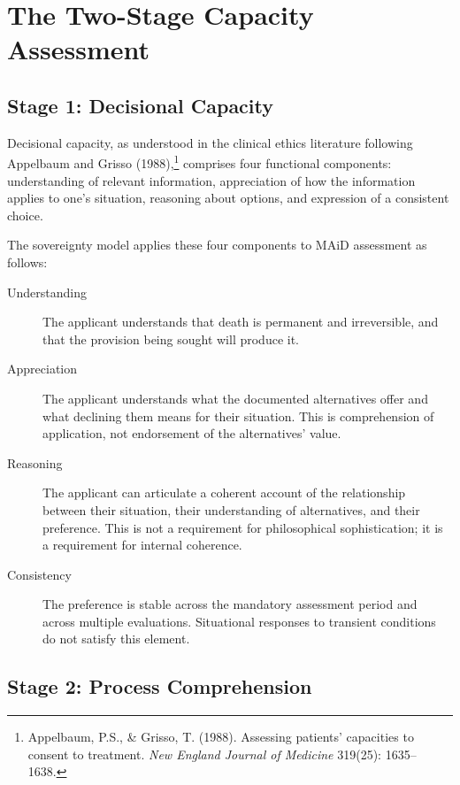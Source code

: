 \documentclass[11pt, letterpaper]{article}
\begin{document}
\section{The Two-Stage Capacity Assessment}

\subsection{Stage 1: Decisional Capacity}

Decisional capacity, as understood in the clinical ethics literature following
Appelbaum and Grisso (1988),\footnote{%
  Appelbaum, P.S., \& Grisso, T. (1988). Assessing patients' capacities to consent
  to treatment. \textit{New England Journal of Medicine} 319(25): 1635--1638.}
comprises four functional components: understanding of relevant information,
appreciation of how the information applies to one's situation, reasoning about
options, and expression of a consistent choice.

The sovereignty model applies these four components to MAiD assessment as follows:

\begin{description}
  \item[Understanding] The applicant understands that death is permanent and
    irreversible, and that the provision being sought will produce it.
  \item[Appreciation] The applicant understands what the documented alternatives offer
    and what declining them means for their situation. This is comprehension of
    application, not endorsement of the alternatives' value.
  \item[Reasoning] The applicant can articulate a coherent account of the relationship
    between their situation, their understanding of alternatives, and their preference.
    This is not a requirement for philosophical sophistication; it is a requirement
    for internal coherence.
  \item[Consistency] The preference is stable across the mandatory assessment period
    and across multiple evaluations. Situational responses to transient conditions
    do not satisfy this element.
\end{description}

\subsection{Stage 2: Process Comprehension}
\end{document}
